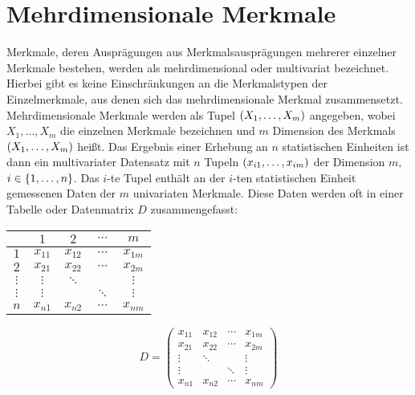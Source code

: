 \documentclass{lecture}
\begin{document}
    \section*{Mehrdimensionale Merkmale}

    Merkmale, deren Ausprägungen aus Merkmalsausprägungen mehrerer einzelner Merkmale bestehen, werden als mehrdimensional oder multivariat bezeichnet.
    Hierbei gibt es keine Einschränkungen an die Merkmalstypen der Einzelmerkmale, aus denen sich das mehrdimensionale Merkmal zusammensetzt.
    Mehrdimensionale Merkmale werden als Tupel \(\parentheses*{X_1, \ldots, X_m}\) angegeben, wobei \(X_1, \ldots, X_m\) die einzelnen Merkmale bezeichnen und \(m\) Dimension des Merkmals \(\parentheses*{X_1, \ldots, X_m}\) heißt.
    Das Ergebnis einer Erhebung an \(n\) statistischen Einheiten ist dann ein multivariater Datensatz mit \(n\) Tupeln \(\parentheses*{x_{i1}, \ldots, x_{im}}\) der Dimension \(m\), \(i \in \braces*{1, \ldots, n}\).
    Das \(i\)-te Tupel enthält an der \(i\)-ten statistischen Einheit gemessenen Daten der \(m\) univariaten Merkmale.
    Diese Daten werden oft in einer Tabelle oder Datenmatrix \(D\) zusammengefasst:
    \begin{center}
        \begin{minipage}{.35\linewidth}
            \begin{tabular}{c|cccc}
                & \(1\) & \(2\) & \(\cdots\) & \(m\)\\
                \hline
                \(1\) & \(x_{11}\) & \(x_{12}\) & \(\cdots\) & \(x_{1m}\)\\
                \(2\) & \(x_{21}\) & \(x_{22}\) & \(\cdots\) & \(x_{2m}\)\\
                \(\vdots\) & \(\vdots\) & \(\ddots\) & & \(\vdots\)\\
                \(\vdots\) & \(\vdots\) & & \(\ddots\) & \(\vdots\)\\
                \(n\) & \(x_{n1}\) & \(x_{n2}\) & \(\cdots\) & \(x_{nm}\)
            \end{tabular}
        \end{minipage}
        \begin{minipage}{.35\linewidth}
            \[
                D = \begin{pmatrix}
                    x_{11} & x_{12} & \cdots & x_{1m}\\
                    x_{21} & x_{22} & \cdots & x_{2m}\\
                    \vdots & \ddots & & \vdots\\
                    \vdots & & \ddots & \vdots\\
                    x_{n1} & x_{n2} & \cdots & x_{nm}
                \end{pmatrix}
            \]
        \end{minipage}
    \end{center}
\end{document}
